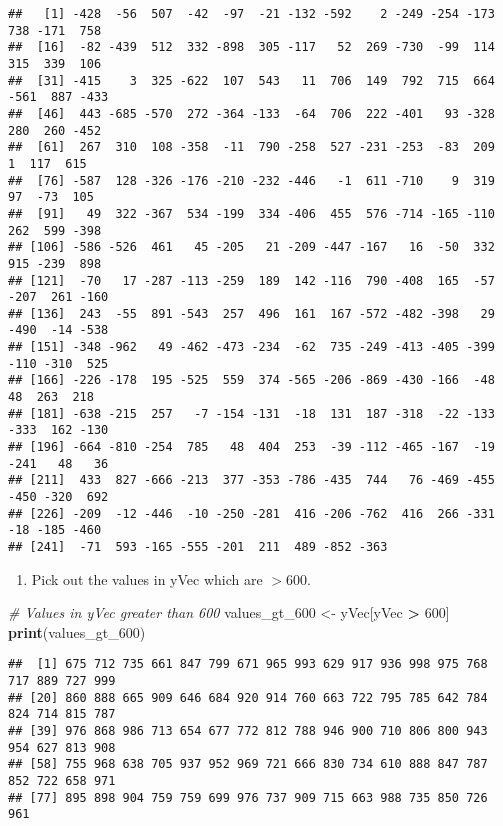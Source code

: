 \documentclass[
]{article}
\newenvironment{Shaded}{\begin{snugshade}}{\end{snugshade}}
\newcommand{\CommentTok}[1]{\textcolor[rgb]{0.56,0.35,0.01}{\textit{#1}}}
\newcommand{\DecValTok}[1]{\textcolor[rgb]{0.00,0.00,0.81}{#1}}
\newcommand{\FunctionTok}[1]{\textcolor[rgb]{0.13,0.29,0.53}{\textbf{#1}}}
\newcommand{\NormalTok}[1]{#1}
\newcommand{\OtherTok}[1]{\textcolor[rgb]{0.56,0.35,0.01}{#1}}
\newcommand{\SpecialCharTok}[1]{\textcolor[rgb]{0.81,0.36,0.00}{\textbf{#1}}}
\providecommand{\tightlist}{%
  \setlength{\itemsep}{0pt}\setlength{\parskip}{0pt}}
\begin{document}
\begin{verbatim}
##   [1] -428  -56  507  -42  -97  -21 -132 -592    2 -249 -254 -173  738 -171  758
##  [16]  -82 -439  512  332 -898  305 -117   52  269 -730  -99  114  315  339  106
##  [31] -415    3  325 -622  107  543   11  706  149  792  715  664 -561  887 -433
##  [46]  443 -685 -570  272 -364 -133  -64  706  222 -401   93 -328  280  260 -452
##  [61]  267  310  108 -358  -11  790 -258  527 -231 -253  -83  209    1  117  615
##  [76] -587  128 -326 -176 -210 -232 -446   -1  611 -710    9  319   97  -73  105
##  [91]   49  322 -367  534 -199  334 -406  455  576 -714 -165 -110  262  599 -398
## [106] -586 -526  461   45 -205   21 -209 -447 -167   16  -50  332  915 -239  898
## [121]  -70   17 -287 -113 -259  189  142 -116  790 -408  165  -57 -207  261 -160
## [136]  243  -55  891 -543  257  496  161  167 -572 -482 -398   29 -490  -14 -538
## [151] -348 -962   49 -462 -473 -234  -62  735 -249 -413 -405 -399 -110 -310  525
## [166] -226 -178  195 -525  559  374 -565 -206 -869 -430 -166  -48   48  263  218
## [181] -638 -215  257   -7 -154 -131  -18  131  187 -318  -22 -133 -333  162 -130
## [196] -664 -810 -254  785   48  404  253  -39 -112 -465 -167  -19 -241   48   36
## [211]  433  827 -666 -213  377 -353 -786 -435  744   76 -469 -455 -450 -320  692
## [226] -209  -12 -446  -10 -250 -281  416 -206 -762  416  266 -331  -18 -185 -460
## [241]  -71  593 -165 -555 -201  211  489 -852 -363
\end{verbatim}

\begin{enumerate}
\def\labelenumi{(\alph{enumi})}
\setcounter{enumi}{1}
\tightlist
\item
  Pick out the values in yVec which are \(> 600\).
\end{enumerate}

\begin{Shaded}
\begin{Highlighting}[]
\CommentTok{\# Values in yVec greater than 600}
\NormalTok{values\_gt\_600 }\OtherTok{\textless{}{-}}\NormalTok{ yVec[yVec }\SpecialCharTok{\textgreater{}} \DecValTok{600}\NormalTok{]}
\FunctionTok{print}\NormalTok{(values\_gt\_600)}
\end{Highlighting}
\end{Shaded}

\begin{verbatim}
##  [1] 675 712 735 661 847 799 671 965 993 629 917 936 998 975 768 717 889 727 999
## [20] 860 888 665 909 646 684 920 914 760 663 722 795 785 642 784 824 714 815 787
## [39] 976 868 986 713 654 677 772 812 788 946 900 710 806 800 943 954 627 813 908
## [58] 755 968 638 705 937 952 969 721 666 830 734 610 888 847 787 852 722 658 971
## [77] 895 898 904 759 759 699 976 737 909 715 663 988 735 850 726 961
\end{verbatim}
\end{document}
